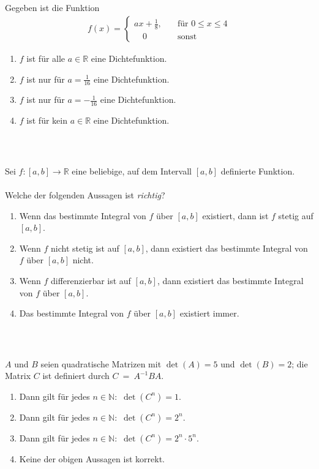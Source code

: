 \subsection*{}
Gegeben ist die Funktion
\begin{align*}
f(x) 
=
\begin{cases}
ax + \frac{1}{8}, &\quad \textrm{für } 0 \leq x \leq 4\\
\quad 0					&\quad  \textrm{sonst}			
\end{cases}
\end{align*}
\renewcommand{\labelenumi}{(\alph{enumi})}
\begin{enumerate}
\item $f $ ist für alle $ a \in \mathbb{R} $ eine Dichtefunktion.
\item $f $ ist nur für $ a = \frac{1}{16} $ eine Dichtefunktion.
\item
$f $ ist nur für $ a = -\frac{1}{16} $ eine Dichtefunktion.
\item
$f $ ist für kein $ a \in \mathbb{R} $ eine Dichtefunktion.
\end{enumerate}
\ \\
\subsection*{}
Sei $ f : [a,b] \to \mathbb{R} $ eine beliebige, auf dem Intervall $ [a,b] $ definierte Funktion.\\
\\
Welche der folgenden Aussagen ist \textit{richtig}?
\renewcommand{\labelenumi}{(\alph{enumi})}
\begin{enumerate}
\item 
Wenn das bestimmte Integral von $ f $ über $ [a,b] $ existiert, dann ist $ f $ stetig auf $ [a,b] $.
\item 
Wenn $ f $ nicht stetig ist auf $ [a,b] $, dann existiert das bestimmte Integral von $ f $ über $ [a,b] $ nicht.
\item 
Wenn $ f $ differenzierbar ist auf $ [a,b] $, dann existiert das bestimmte Integral von $ f $ über $ [a,b] $.
\item
Das bestimmte Integral von $ f $ über $ [a,b]$ existiert immer.
\end{enumerate}
\ \\
\subsection*{}
$A$ und $B$ seien quadratische Matrizen mit
$\det(A) = 5$ und $\det(B) = 2$; die Matrix $ C $ ist definiert durch 
$C \ = \ A^{-1}B A $. 
\renewcommand{\labelenumi}{(\alph{enumi})}
\begin{enumerate}
	\item 
	Dann gilt für jedes $ n \in \mathbb{N}: $ $ \det(C^n)  = 1$.
	\item
	Dann gilt für jedes $ n \in \mathbb{N}: $ $ \det(C^n)  = 2^n$.
	\item
	Dann gilt für jedes $ n \in \mathbb{N}: $ $ \det(C^n)  = 2^n \cdot 5^n$.
	\item
	Keine der obigen Aussagen ist korrekt.
\end{enumerate}
\ \\
